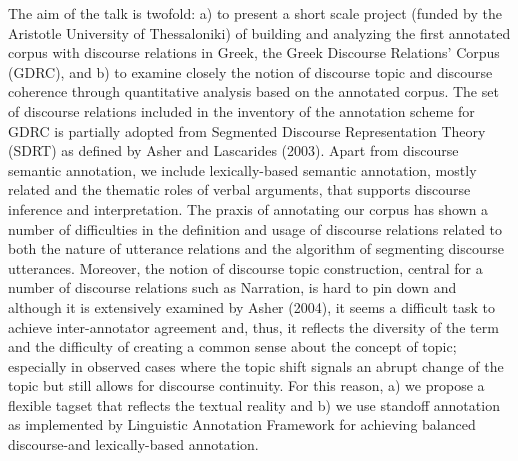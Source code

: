 \documentclass[10pt, a4paper, twopage, headinclude, footinclude, BCOR5mm]{book}
\begin{document}
\begin{table}[t!]
\end{table} 
\noindent
The aim of the talk is twofold: a) to present a short scale project (funded by the Aristotle University of Thessaloniki) of building and analyzing the first annotated corpus with discourse relations in Greek, the Greek Discourse Relations' Corpus (GDRC), and b) to examine closely the notion of discourse topic and discourse coherence through quantitative analysis based on the annotated corpus. The set of discourse relations included in the inventory of the annotation scheme for GDRC is partially adopted from Segmented Discourse Representation Theory (SDRT) as defined by Asher and Lascarides (2003). Apart from discourse semantic annotation, we include lexically-based semantic annotation, mostly related and the thematic roles of verbal arguments, that supports discourse inference and interpretation. The praxis of annotating our corpus has shown a number of difficulties in the definition and usage of discourse relations related to both the nature of utterance relations and the algorithm of segmenting discourse utterances. Moreover, the notion of discourse topic construction, central for a number of discourse relations such as Narration, is hard to pin down and although it is extensively examined by Asher (2004), it seems a difficult task to achieve inter-annotator agreement and, thus, it reflects the diversity of the term and the difficulty of creating a common sense about the concept of topic; especially in observed cases where the topic shift signals an abrupt change of the topic but still allows for discourse continuity. For this reason, a) we propose a flexible tagset that reflects the textual reality and b) we use standoff annotation as implemented by Linguistic Annotation Framework for achieving balanced discourse-and lexically-based annotation.    
\end{document}
